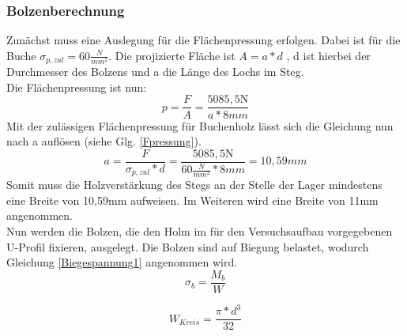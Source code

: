

\subsubsection{Bolzenberechnung} \label{Bolzenberechnung}
Zunächst muss eine Auslegung für die Flächenpressung erfolgen. Dabei ist für die Buche $\sigma_{p,zul}=60\frac{N}{mm^2}$.
Die projizierte Fläche ist $A=a*d$ , d ist hierbei der Durchmesser des Bolzens und a die Länge des Lochs im Steg.\\
\noindent
Die Flächenpressung ist nun: 
\begin{equation}
	p=\frac{F}{A}=\frac{5085,5\mathrm{N}}{a*8mm}
\end{equation}
Mit der zulässigen Flächenpressung für Buchenholz lässt sich die Gleichung nun nach a auflösen (siehe Glg. \ref{Fpressung}).
\begin{equation}
\label{Fpressung}
	a=\frac{F}{\sigma_{p,zul}*d}=\frac{5085,5\mathrm{N}}{60\frac{N}{mm^{2}}*8mm}=10,59mm
\end{equation}
Somit muss die Holzverstärkung des Stegs an der Stelle der Lager mindestens eine Breite von 10,59$\mathrm{mm}$ aufweisen. Im Weiteren wird eine Breite von 11$\mathrm{mm}$ angenommen.\\
\noindent
Nun werden die Bolzen, die den Holm im für den Versuchsaufbau vorgegebenen U-Profil fixieren, ausgelegt. Die Bolzen sind auf Biegung belastet, wodurch Gleichung \ref{Biegespannung1} angenommen wird.
\begin{equation}
\label{Biegespannung1}
	\sigma_{b}=\frac{M_{b}}{W} 
\end{equation}
 
 \begin{equation}
 \label{WKreis}
 	W_{Kreis}=\frac{\pi*d^{3}}{32}
 \end{equation}
  
